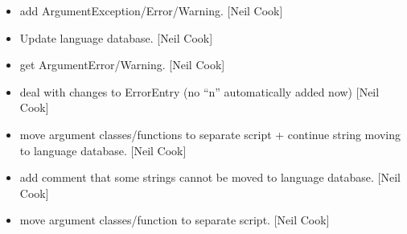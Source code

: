 \documentclass[a4paper,10pt,english]{report}
\begin{document}
\begin{itemize}
\item {} 
 \sphinxhyphen{} add ArgumentException/Error/Warning. {[}Neil Cook{]}

\item {} 
Update language database. {[}Neil Cook{]}

\item {} 
 \sphinxhyphen{} get ArgumentError/Warning. {[}Neil Cook{]}

\item {} 
 \sphinxhyphen{} deal with changes to ErrorEntry (no “n”
automatically added now) {[}Neil Cook{]}

\item {} 
 \sphinxhyphen{} move argument classes/functions to separate script +
continue string moving to language database. {[}Neil Cook{]}

\item {} 
 \sphinxhyphen{} add comment that some strings cannot be moved to language
database. {[}Neil Cook{]}

\item {} 
 \sphinxhyphen{} move argument classes/function to separate script.
{[}Neil Cook{]}

\end{itemize}
\end{document}
